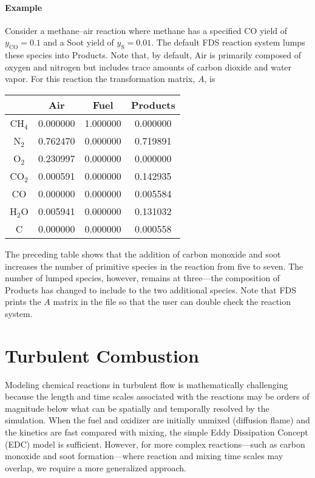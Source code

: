 \paragraph{Example} Consider a methane--air reaction where methane has a specified CO yield of $y_{\mathrm{CO}}=0.1$ and a Soot yield of $y_{\mathrm{S}}=0.01$. The default FDS reaction system lumps these species into Products. Note that, by default, Air is primarily composed of oxygen and nitrogen but includes trace amounts of carbon dioxide and water vapor. For this reaction the transformation matrix, $A$, is
\begin{center}
\begin{tabular}{c c c c }
                   & Air & Fuel & Products \\ \hline
{CH$_4$}           & 0.000000 & 1.000000 & 0.000000 \\
{N$_2$}            & 0.762470 & 0.000000 & 0.719891 \\
{O$_2$}            & 0.230997 & 0.000000 & 0.000000 \\
{CO$_2$}           & 0.000591 & 0.000000 & 0.142935 \\
{CO}               & 0.000000 & 0.000000 & 0.005584 \\
{H$_2$O}           & 0.005941 & 0.000000 & 0.131032 \\
{C}                & 0.000000 & 0.000000 & 0.000558 \\
\end{tabular}
\end{center}

\noindent The preceding table shows that the addition of carbon monoxide and soot increases the number of primitive species in the reaction from five to seven. The number of lumped species, however, remains at three---the composition of Products has changed to include to the two additional species.  Note that FDS prints the $A$ matrix in the  file so that the user can double check the reaction system.


\clearpage

\section{Turbulent Combustion}
\label{sec:batchreactormodel}

Modeling chemical reactions in turbulent flow is mathematically challenging because the length and time scales associated with the reactions may be orders of magnitude below what can be spatially and temporally resolved by the simulation.  When the fuel and oxidizer are initially unmixed (diffusion flame) and the kinetics are fast compared with mixing, the simple Eddy Dissipation Concept (EDC) model \cite{Magnussen:1,Poinsot:TNC} is sufficient.  However, for more complex reactions---such as carbon monoxide and soot formation---where reaction and mixing time scales may overlap, we require a more generalized approach.

